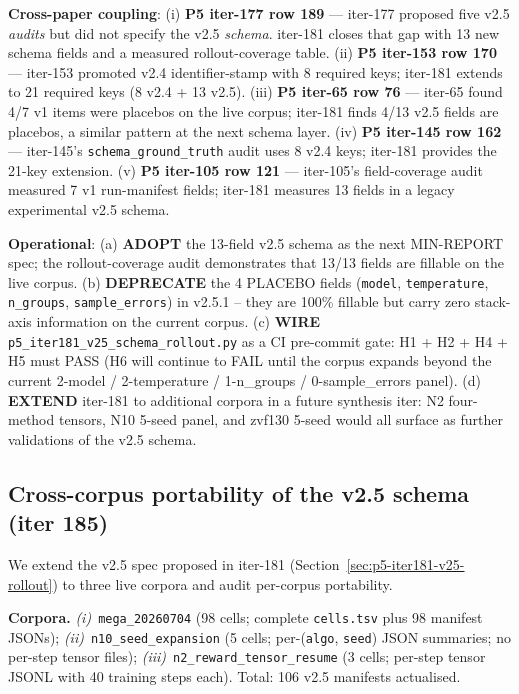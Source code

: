 \documentclass{article}  \usepackage[preprint,nonatbib]{neurips_2026} \usepackage[numbers]{natbib}
\begin{document}
\noindent\textbf{Cross-paper coupling}: (i) \textbf{P5 iter-177 row 189} ---
iter-177 proposed five v2.5 \emph{audits} but did not specify the v2.5
\emph{schema}. iter-181 closes that gap with 13 new schema fields and a
measured rollout-coverage table. (ii) \textbf{P5 iter-153 row 170} ---
iter-153 promoted v2.4 identifier-stamp with 8 required keys; iter-181
extends to 21 required keys (8 v2.4 + 13 v2.5). (iii) \textbf{P5 iter-65
row 76} --- iter-65 found 4/7 v1 items were placebos on the live corpus;
iter-181 finds 4/13 v2.5 fields are placebos, a similar pattern at the
next schema layer. (iv) \textbf{P5 iter-145 row 162} --- iter-145's
\texttt{schema\_ground\_truth} audit uses 8 v2.4 keys; iter-181 provides
the 21-key extension. (v) \textbf{P5 iter-105 row 121} --- iter-105's
field-coverage audit measured 7 v1 run-manifest fields; iter-181 measures 13
fields in a legacy experimental v2.5 schema.

\noindent\textbf{Operational}: (a) \textbf{ADOPT} the 13-field v2.5
schema as the next MIN-REPORT spec; the rollout-coverage audit
demonstrates that 13/13 fields are fillable on the live corpus.
(b) \textbf{DEPRECATE} the 4 PLACEBO fields (\texttt{model},
\texttt{temperature}, \texttt{n\_groups}, \texttt{sample\_errors})
in v2.5.1 -- they are 100\% fillable but carry zero stack-axis
information on the current corpus. (c) \textbf{WIRE}
\texttt{p5\_iter181\_v25\_schema\_rollout.py} as a CI pre-commit gate:
H1 + H2 + H4 + H5 must PASS (H6 will continue to FAIL until the corpus
expands beyond the current 2-model / 2-temperature / 1-n_groups /
0-sample_errors panel). (d) \textbf{EXTEND} iter-181 to additional
corpora in a future synthesis iter: N2 four-method tensors, N10 5-seed
panel, and zvf130 5-seed would all surface as further validations of
the v2.5 schema.
 \subsection{Cross-corpus portability of the v2.5 schema (iter 185)}

We extend the v2.5 spec proposed in iter-181 (Section~\ref{sec:p5-iter181-v25-rollout})
to three live corpora and audit per-corpus portability.

\textbf{Corpora.}
\textit{(i)}~\texttt{mega\_20260704} (98 cells; complete
\texttt{cells.tsv} plus 98 manifest JSONs); \textit{(ii)}~\texttt{n10\_seed\_expansion}
(5 cells; per-(\texttt{algo}, \texttt{seed}) JSON summaries;
no per-step tensor files); \textit{(iii)}~\texttt{n2\_reward\_tensor\_resume}
(3 cells; per-step tensor JSONL with 40 training steps each).
Total: 106 v2.5 manifests actualised.
\end{document}
